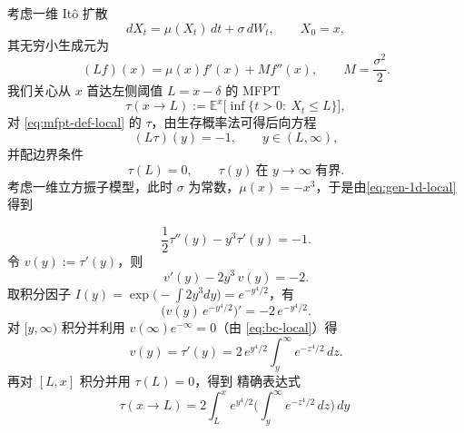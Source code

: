 考虑一维 It\^o 扩散
\begin{equation}\label{eq:sde-mfpt-local}
	dX_t=\mu(X_t)\,dt+\sigma\,dW_t,\qquad X_0=x,
\end{equation}
其无穷小生成元为
\begin{equation}\label{eq:gen-1d-local}
	(L f)(x)=\mu(x)f'(x)+M f''(x),\qquad M=\frac{\sigma^{2}}{2}.
\end{equation}
我们关心从 $x$ 首达左侧阈值 $L=x-\delta$ 的 MFPT
\begin{equation}\label{eq:mfpt-def-local}
	\tau(x\to L):=\mathbb E^{x}\!\big[\inf\{t>0:\ X_t\le L\}\big],
\end{equation}
对 \eqref{eq:mfpt-def-local} 的 $\tau$，由生存概率法\cite{weinan2021applied}可得后向方程
\begin{equation}\label{eq:backward-mfpt-local}
	(L\tau)(y)=-1,\qquad y\in(L,\infty),
\end{equation}
并配边界条件
\begin{equation}\label{eq:bc-local}
	\tau(L)=0,\qquad \tau(y)\ \text{在 }y\to\infty\text{ 有界}.
\end{equation}
考虑一维立方振子模型，此时 $\sigma$ 为常数，\( \mu(x) = -x^3 \)，于是由\eqref{eq:gen-1d-local} 得到

\begin{equation}\label{eq:ode-cubic}
	\frac{1}{2}\tau''(y)-y^{3}\tau'(y)=-1.
\end{equation}
令 $v(y):=\tau'(y)$，则
\begin{equation}\label{eq:v-ode}
	v'(y)-2y^3\,v(y)=-2.
\end{equation}
取积分因子 $I(y)=\exp\!\big(-\int 2y^3dy\big)=e^{-y^4/2}$，有
\[
\big(v(y)\,e^{-y^4/2}\big)'=-2\,e^{-y^4/2}.
\]
对 \([y,\infty)\) 积分并利用 $v(\infty)e^{-\infty}=0$（由 \eqref{eq:bc-local}）得
\begin{equation}\label{eq:v-sol}
	v(y)=\tau'(y)=2\,e^{y^4/2}\int_{y}^{\infty}e^{-z^4/2}\,dz.
\end{equation}
再对 \([L,x]\) 积分并用 $\tau(L)=0$，得到 精确表达式
\begin{equation}\label{eq:tau-int-exact}
	\tau(x\to L)=2\int_{L}^{x} e^{y^{4}/2}
	\Big(\int_{y}^{\infty} e^{-z^{4}/2}\,dz\Big)\,dy\ 
\end{equation}

